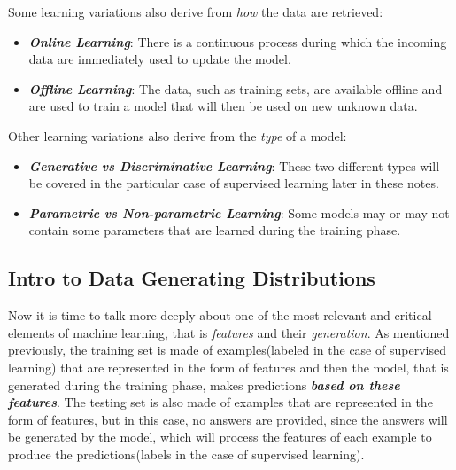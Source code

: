 \noindent Some learning variations also derive from \emph{how} the data
are retrieved:

\begin{itemize}
      \item \emph{\textbf{Online Learning}}: There is a continuous
            process during which the incoming data are immediately
            used to update the model.

      \item \emph{\textbf{Offline Learning}}: The data, such as training
            sets, are available offline and are used to train a model
            that will then be used on new unknown data.
\end{itemize}

\noindent Other learning variations also derive from the \emph{type} of
a model:

\begin{itemize}
      \item \emph{\textbf{Generative vs Discriminative Learning}}:
            These two different types will be covered in the
            particular case of supervised learning later in these notes.
      \item \emph{\textbf{Parametric vs Non-parametric Learning}}:
            Some models may or may not contain some parameters that
            are learned during the training phase.
\end{itemize}

\subsection{Intro to Data Generating Distributions}

Now it is time to talk more deeply about one of the most relevant
and critical elements of machine learning, that is \emph{features}
and their \emph{generation}. As mentioned previously, the training
set is made of examples(labeled in the case of supervised learning)
that are represented in the form of features and then the model,
that is generated during the training phase, makes predictions
\emph{\textbf{based on these features}}. The testing set is also made of
examples that are represented in the form of features, but in this
case, no answers are provided, since the answers will be generated by
the model, which will process the features of each example to produce
the predictions(labels in the case of supervised learning).

\newpage

